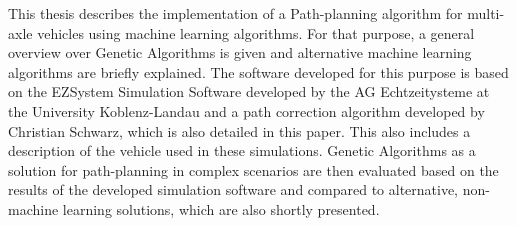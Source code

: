 \abstractEN

This thesis describes the implementation of a Path-planning algorithm for multi-axle vehicles using machine learning algorithms. For that purpose, a general overview over Genetic Algorithms is given and alternative machine learning algorithms are briefly explained. The software developed for this purpose is based on the EZSystem Simulation Software developed by the AG Echtzeitysteme at the University Koblenz-Landau and a path correction algorithm developed by Christian Schwarz, which is also detailed in this paper. This also includes a description of the vehicle used in these simulations. 
Genetic Algorithms as a solution for path-planning in complex scenarios are then evaluated based on the results of the developed simulation software and compared to alternative, non-machine learning solutions, which are also shortly presented.

